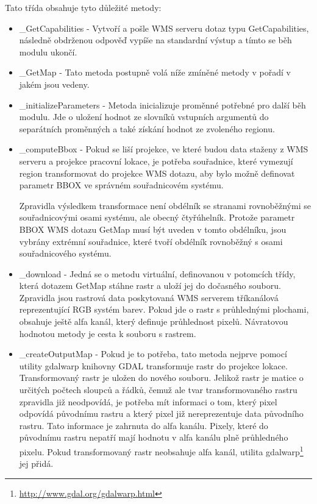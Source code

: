 \documentclass[a4paper,12pt]{article}
\begin{document}
Tato třída obsahuje tyto důležité metody:  
\begin{itemize}
  \item \_GetCapabilities - Vytvoří a pošle WMS serveru dotaz typu
    GetCapabilities, následně obdrženou odpověď vypíše na standardní
    výstup a tímto se běh modulu ukončí.
  \item \_GetMap - Tato metoda postupně volá níže zmíněné metody v
    pořadí v jakém jsou vedeny.
  \item \_initializeParameters - Metoda inicializuje proměnné potřebné
    pro další běh modulu. Jde o uložení hodnot ze slovníků vstupních
    argumentů do separátních proměnných a také získání hodnot ze
    zvoleného regionu.
  \item \_computeBbox - Pokud se liší projekce, ve které budou data
    staženy z WMS serveru a projekce pracovní lokace, je potřeba
    souřadnice, které vymezují region transformovat do projekce WMS
    dotazu, aby bylo možně definovat parametr BBOX ve správném
    souřadnicovém systému.

   Zpravidla výsledkem transformace není obdélník se stranami
   rovnoběžnými se souřadnicovými osami systému, ale obecný
   čtyřúhelník. Protože parametr BBOX WMS dotazu GetMap musí být
   uveden v tomto obdélníku, jsou vybrány extrémní souřadnice, které
   tvoří obdélník rovnoběžný s osami souřadnicového systému.
  \item \_download - Jedná se o metodu virtuální, definovanou v
    potomcích třídy, která dotazem GetMap stáhne rastr a uloží jej do
    dočasného souboru. Zpravidla jsou rastrová data poskytovaná WMS
    serverem tříkanálová reprezentující RGB systém barev. Pokud jde o
    rastr s průhlednými plochami, obsahuje ještě alfa kanál, který
    definuje průhlednost pixelů. Návratovou hodnotou metody je cesta k
    souboru s rastrem.
  \item \_createOutputMap - Pokud je to potřeba, tato metoda nejprve
    pomocí utility gdalwarp knihovny GDAL transformuje rastr do
    projekce lokace. Transformovaný rastr je uložen do nového souboru.
    Jelikož rastr je matice o určitých počtech sloupců a řádků, čemuž
    ale tvar transformovaného rastru zpravidla již neodpovídá, je
    potřeba mít informaci o tom, který pixel odpovídá původnímu rastru
    a který pixel již nereprezentuje data původního rastru. Tato
    informace je zahrnuta do alfa kanálu. Pixely, které do původnímu
    rastru nepatří mají hodnotu v alfa kanálu plně průhledného pixelu.
    Pokud transformovaný rastr neobsahuje alfa kanál, utilita
    gdalwarp\footnote{\url{http://www.gdal.org/gdalwarp.html}} jej
    přidá.
\end{itemize}
\end{document}

